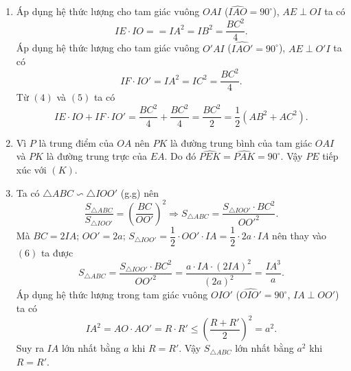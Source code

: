\begin{bt}
{\begin{enumerate}
\begin{center}
	\end{center}
\item Áp dụng hệ thức lượng cho tam giác vuông $OAI$ ($\widehat{IAO}=90^\circ$), $AE\perp OI$ ta có 
\[IE\cdot IO==IA^2=IB^2=\dfrac{BC^2}{4}.\tag{4}\]
Áp dụng hệ thức lượng cho tam giác vuông $O'AI$ ($\widehat{IAO'}=90^\circ$), $AE\perp O'I$ ta có 
\[IF\cdot IO'=IA^2=IC^2=\dfrac{BC^2}{4}.\tag{5}\]
Từ $(4)$ và $(5)$ ta có \[IE\cdot IO+IF\cdot IO'=\dfrac{BC^2}{4}+\dfrac{BC^2}{4}=\dfrac{BC^2}{2}=\dfrac{1}{2}\left(AB^2+AC^2\right).\]
\item Vì $P$ là trung điểm của $OA$ nên $PK$ là đường trung bình của tam giác $OAI$ và $PK$ là đường trung trực của $EA$. Do đó $\widehat{PEK}=\widehat{PAK}=90^\circ$. Vậy $PE$ tiếp xúc với $(K)$.
\item Ta có $\triangle ABC\backsim\triangle IOO'$ (g.g) nên 
\[\dfrac{S_{\triangle ABC}}{S_{\triangle IOO'}}=\left(\dfrac{BC}{OO'}\right)^2\Rightarrow S_{\triangle ABC}=\dfrac{S_{\triangle IOO'}\cdot BC^2}{OO'^2}.\tag{6}\]
Mà $BC=2IA$; $OO'=2a$; $S_{\triangle IOO'}=\dfrac{1}{2}\cdot OO'\cdot IA=\dfrac{1}{2}\cdot 2a\cdot IA$ nên thay vào $(6)$ ta được
\[S_{\triangle ABC}=\dfrac{S_{\triangle IOO'}\cdot BC^2}{OO'^2}=\dfrac{a\cdot IA\cdot \left(2IA\right)^2}{\left(2a\right)^2}=\dfrac{IA^3}{a}.\]
Áp dụng hệ thức lượng trong tam giác vuông $OIO'$ ($\widehat{OIO'}=90^\circ$, $IA\perp OO'$) ta có
\[IA^2=AO\cdot AO'=R\cdot R'\le \left(\dfrac{R+R'}{2}\right)^2=a^2.\]
Suy ra $IA$ lớn nhất bằng $a$ khi $R=R'$. Vậy $S_{\triangle ABC}$ lớn nhất bằng $a^2$ khi $R=R'$.
\end{enumerate}
}
\end{bt}
